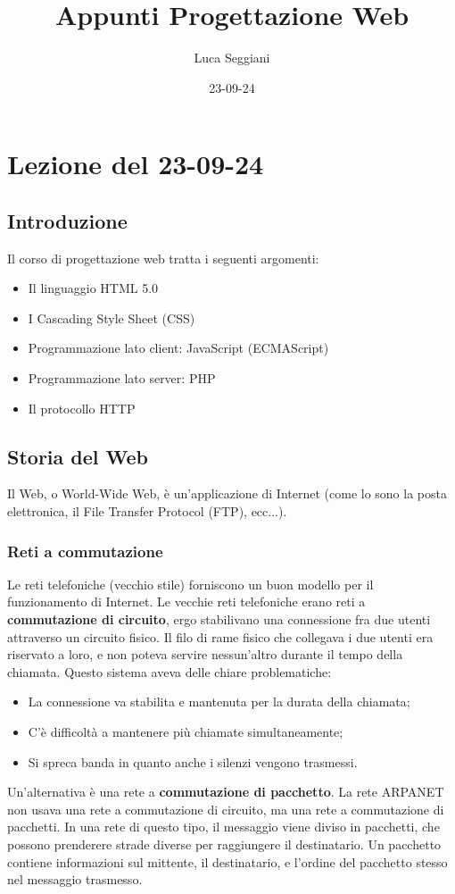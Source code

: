 \documentclass[a4paper,11pt]{article}
\title{Appunti Progettazione Web}
\author{Luca Seggiani}
\date{23-09-24}
\begin{document}
\section{Lezione del 23-09-24}

\thispagestyle{empty}
\pagestyle{fancy}

\subsection{Introduzione}
Il corso di progettazione web tratta i seguenti argomenti:

\begin{itemize}
	\item Il linguaggio HTML 5.0
	\item I Cascading Style Sheet (CSS)
	\item Programmazione lato client: JavaScript (ECMAScript)
	\item Programmazione lato server: PHP
	\item Il protocollo HTTP
\end{itemize}

\subsection{Storia del Web}

Il Web, o World-Wide Web, è un'applicazione di Internet (come lo sono la posta elettronica, il File Transfer Protocol (FTP), ecc...).

\subsubsection{Reti a commutazione}

Le reti telefoniche (vecchio stile) forniscono un buon modello per il funzionamento di Internet.
Le vecchie reti telefoniche erano reti a \textbf{commutazione di circuito}, ergo stabilivano una connessione fra due utenti attraverso un circuito fisico.
Il filo di rame fisico che collegava i due utenti era riservato a loro, e non poteva servire nessun'altro durante il tempo della chiamata.
Questo sistema aveva delle chiare problematiche:
\begin{itemize}
	\item La connessione va stabilita e mantenuta per la durata della chiamata;
	\item C'è difficoltà a mantenere più chiamate simultaneamente;
	\item Si spreca banda in quanto anche i silenzi vengono trasmessi.
\end{itemize}
Un'alternativa è una rete a \textbf{commutazione di pacchetto}.
La rete ARPANET non usava una rete a commutazione di circuito, ma una rete a commutazione di pacchetti.
In una rete di questo tipo, il messaggio viene diviso in pacchetti, che possono prenderere strade diverse per raggiungere il destinatario.
Un pacchetto contiene informazioni sul mittente, il destinatario, e l'ordine del pacchetto stesso nel messaggio trasmesso.
\end{document}
